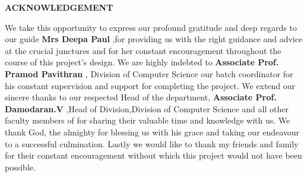 \centerline{\large{\bfseries{ACKNOWLEDGEMENT}}}

\hspace{1in}

\normalsize

We take this opportunity to express our profound gratitude and deep regards to our guide \textbf{Mrs Deepa Paul}
,for providing us with the right guidance and advice at the crucial junctures and for her constant encouragement throughout the course of this project's design. We are highly indebted to \textbf{Associate Prof. Pramod Pavithran}
 , Division of Computer Science our batch coordinator for his constant supervision and support for completing the project. We extend our sincere thanks to our respected Head of the department, \textbf{Associate Prof. Damodaran.V}
 ,Head of Division,Division of Computer Science and all other faculty members of for sharing their valuable time and knowledge with us. We thank God, the almighty for blessing us with his grace and taking our endeavour to a successful culmination. Lastly we would like to thank my friends and family for their constant encouragement without which this project would not have been possible.
